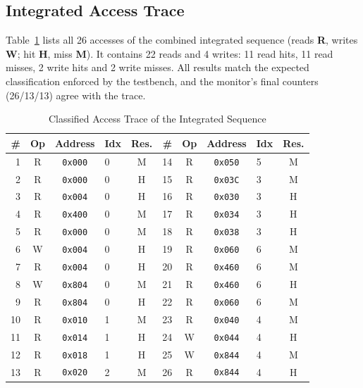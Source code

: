 \documentclass[conference,a4paper]{IEEEtran}
\begin{document}
\subsection{Integrated Access Trace}\label{sec:trace}
Table~\ref{tab:trace} lists all 26 accesses of the combined integrated sequence (reads \textbf{R}, writes \textbf{W}; hit \textbf{H}, miss \textbf{M}). It contains 22 reads and 4 writes: 11 read hits, 11 read misses, 2 write hits and 2 write misses. All results match the expected classification enforced by the testbench, and the monitor's final counters (26/13/13) agree with the trace.

\begin{table}[!t]
\caption{Classified Access Trace of the Integrated Sequence}\label{tab:trace}
\centering
\renewcommand{\arraystretch}{1.05}
\footnotesize
\begin{tabular}{@{}rcclc@{\hspace{1.6em}}rcclc@{}}
\toprule
\textbf{\#} & \textbf{Op} & \textbf{Address} & \textbf{Idx} & \textbf{Res.} & \textbf{\#} & \textbf{Op} & \textbf{Address} & \textbf{Idx} & \textbf{Res.}\\
\midrule
1 & R & \texttt{0x000} & 0 & M & 14 & R & \texttt{0x050} & 5 & M\\
2 & R & \texttt{0x000} & 0 & H & 15 & R & \texttt{0x03C} & 3 & M\\
3 & R & \texttt{0x004} & 0 & H & 16 & R & \texttt{0x030} & 3 & H\\
4 & R & \texttt{0x400} & 0 & M & 17 & R & \texttt{0x034} & 3 & H\\
5 & R & \texttt{0x000} & 0 & M & 18 & R & \texttt{0x038} & 3 & H\\
6 & W & \texttt{0x004} & 0 & H & 19 & R & \texttt{0x060} & 6 & M\\
7 & R & \texttt{0x004} & 0 & H & 20 & R & \texttt{0x460} & 6 & M\\
8 & W & \texttt{0x804} & 0 & M & 21 & R & \texttt{0x460} & 6 & H\\
9 & R & \texttt{0x804} & 0 & H & 22 & R & \texttt{0x060} & 6 & M\\
10 & R & \texttt{0x010} & 1 & M & 23 & R & \texttt{0x040} & 4 & M\\
11 & R & \texttt{0x014} & 1 & H & 24 & W & \texttt{0x044} & 4 & H\\
12 & R & \texttt{0x018} & 1 & H & 25 & W & \texttt{0x844} & 4 & M\\
13 & R & \texttt{0x020} & 2 & M & 26 & R & \texttt{0x844} & 4 & H\\
\bottomrule
\end{tabular}
\end{table}
\end{document}

